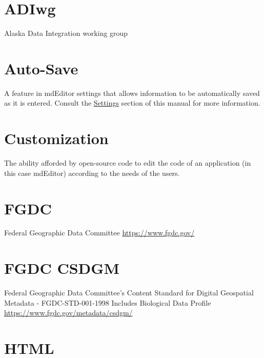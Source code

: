 \documentclass[
]{book}
\begin{document}
\hypertarget{adiwg}{%
\section*{ADIwg}\label{adiwg}}

Alaska Data Integration working group

\hypertarget{auto-save}{%
\section*{Auto-Save}\label{auto-save}}

A feature in mdEditor settings that allows information to be automatically saved as it is entered. Consult the \protect\hyperlink{settings}{Settings} section of this manual for more information.

\hypertarget{customization}{%
\section*{Customization}\label{customization}}

The ability afforded by open-source code to edit the code of an application (in this case mdEditor) according to the needs of the users.

\hypertarget{fgdc}{%
\section*{FGDC}\label{fgdc}}

Federal Geographic Data Committee \url{https://www.fgdc.gov/}

\hypertarget{fgdc-csdgm}{%
\section*{FGDC CSDGM}\label{fgdc-csdgm}}

Federal Geographic Data Committee's Content Standard for Digital Geospatial Metadata - FGDC-STD-001-1998 Includes Biological Data Profile \url{https://www.fgdc.gov/metadata/csdgm/}

\hypertarget{html}{%
\section*{HTML}\label{html}}
\end{document}
